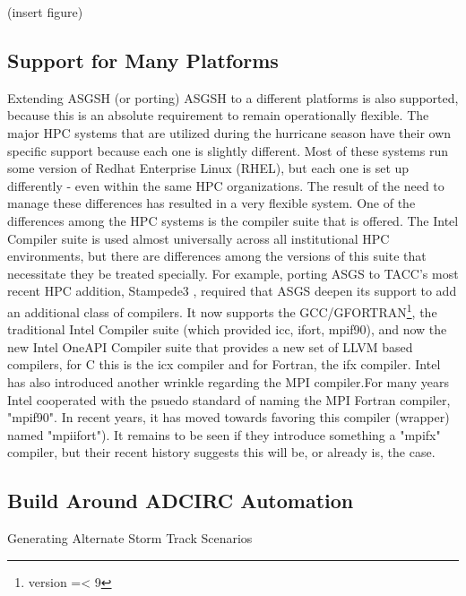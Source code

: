 \documentclass{article}
\begin{document}
(insert figure)

\subsection{Support for Many Platforms}

Extending ASGSH (or porting) ASGSH to a different platforms is also supported,
because this is an absolute requirement to remain operationally flexible. The
major HPC systems that are utilized during the hurricane season have their own
specific support because each one is slightly different. Most of these systems
run some version of Redhat Enterprise Linux (RHEL), but each one is set up
differently - even within the same HPC organizations. The result of the need to
manage these differences has resulted in a very flexible system.  One of the
differences among the HPC systems is the compiler suite that is offered. The
Intel Compiler suite is used almost universally across all institutional HPC
environments, but there are differences among the versions of this suite that
necessitate they be treated specially. For example, porting ASGS to TACC's most
recent HPC addition, Stampede3 \cite{stampede3}, required that ASGS deepen its support to
add an additional class of compilers. It now supports the
GCC/GFORTRAN\footnote{version =< 9}, the traditional Intel Compiler suite
(which provided icc, ifort, mpif90), and now the new Intel OneAPI Compiler suite
that provides a new set of LLVM based compilers, for C this is the icx compiler
and for Fortran, the ifx compiler. Intel has also introduced another wrinkle
regarding the MPI compiler.For many years Intel cooperated with the psuedo
standard of naming the MPI Fortran compiler, "mpif90". In recent years, it has
moved towards favoring this compiler (wrapper) named "mpiifort"). It remains to
be seen if they introduce something a "mpifx" compiler, but their recent history
suggests this will be, or already is, the case.

\subsection{Build Around ADCIRC Automation}

Generating Alternate Storm Track Scenarios
\end{document}

